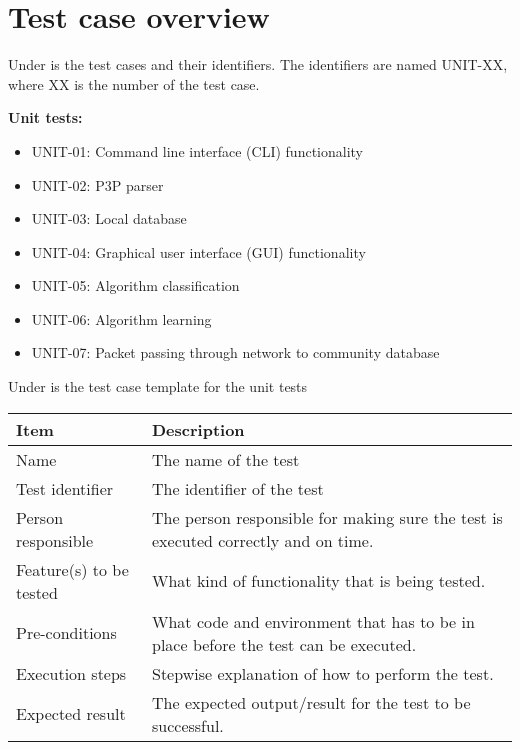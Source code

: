 	\section{Test case overview}
		Under is the test cases and their identifiers. The identifiers are named UNIT-XX, where XX is the number of the test case. 
		\vspace{8 mm}
		
		\textbf{Unit tests:}
		\begin{itemize}
			\renewcommand{\labelitemi}{$\bullet$}
				\item UNIT-01: Command line interface (CLI) functionality
				\item UNIT-02: P3P parser
				\item UNIT-03: Local database
				\item UNIT-04: Graphical user interface (GUI) functionality
				\item UNIT-05: Algorithm classification
				\item UNIT-06: Algorithm learning
				\item UNIT-07: Packet passing through network to community database
		\end{itemize}

		\vspace{8 mm}
		Under is the test case template for the unit tests
		\vspace{8 mm}

		\begin{center}
			\begin{tabular}{ |  p{3.5cm} | p{10cm} | }
				\hline
				Item & Description \\ [5pt] \hline \hline
				Name & The name of the test \\  [5pt] \hline
				Test identifier & The identifier of the test \\  [5pt] \hline
				Person responsible & The person responsible for making sure the test is executed correctly and on time. \\  [5pt] \hline
				Feature(s) to be tested & What kind of functionality that is being tested. \\  [5pt] \hline
				Pre-conditions & What code and environment that has to be in place before the test can be executed. \\  [5pt] \hline
				Execution steps & Stepwise explanation of how to perform the test. \\  [5pt] \hline
				Expected result & The expected output/result for the test to be successful. \\  [5pt] \hline
			\end{tabular}
		\end{center}

